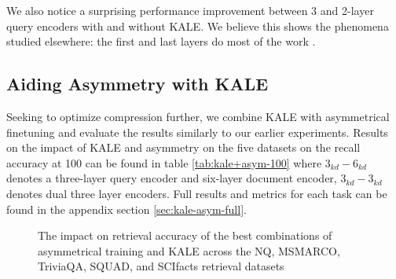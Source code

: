 We also notice a surprising performance improvement between 3 and 2-layer query encoders with and without KALE. We believe this shows the phenomena studied elsewhere: the first and last layers do most of the work \cite{Oh2022DontJA}. 
\subsection{Aiding Asymmetry with KALE}
Seeking to optimize compression further, we combine KALE with asymmetrical finetuning and evaluate the results similarly to our earlier experiments. Results on the impact of KALE and asymmetry on the five datasets on the recall accuracy at 100 can be found in table \ref{tab:kale+asym-100} where $3_{kd}-6_{kd}$ denotes a three-layer query encoder and six-layer document encoder, $3_{kd}-3_{kd}$ denotes dual three layer encoders. Full results and metrics for each task can be found in the appendix section \ref{sec:kale-asym-full}. \\
\begin{figure}[!htb]
    \centering
    \caption{The impact on retrieval accuracy of the best combinations of asymmetrical training and KALE across the NQ, MSMARCO, TriviaQA, SQUAD, and SCIfacts retrieval datasets}
    \label{fig:speed-vs-acc}
\end{figure}
